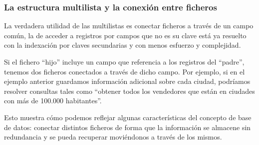 \documentclass[10pt,a4paper,spanish]{report}
\begin{document}
\textcolor[rgb]{1,0.2,0.3}{\subsubsection{La estructura multilista y la conexión entre ficheros}}
La verdadera utilidad de las multilistas es conectar ficheros a través de un campo común, la de acceder a registros por campos que no es su clave está ya resuelto con la indexación por claves secundarias y con menos esfuerzo y complejidad.

Si el fichero ``hijo'' incluye un campo que referencia a los registros del ``padre'', tenemos dos ficheros conectados a través de dicho campo. Por ejemplo, si en el ejemplo anterior guardamos información adicional sobre cada ciudad, podríamos resolver consultas tales como ``obtener todos los vendedores que están en ciudades con más de 100.000 habitantes''.

Esto muestra cómo podemos reflejar algunas características del concepto de base de datos: conectar distintos ficheros de forma que la información se almacene sin redundancia y se pueda recuperar moviéndonos a través de los mismos.
\end{document}
